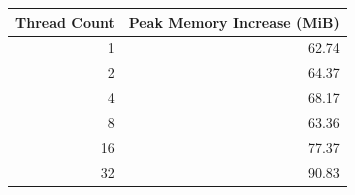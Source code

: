 \begin{tabular}{rr}
\toprule
Thread Count & Peak Memory Increase (MiB) \\
\midrule
1 & 62.74 \\
2 & 64.37 \\
4 & 68.17 \\
8 & 63.36 \\
16 & 77.37 \\
32 & 90.83 \\
\bottomrule
\end{tabular}
